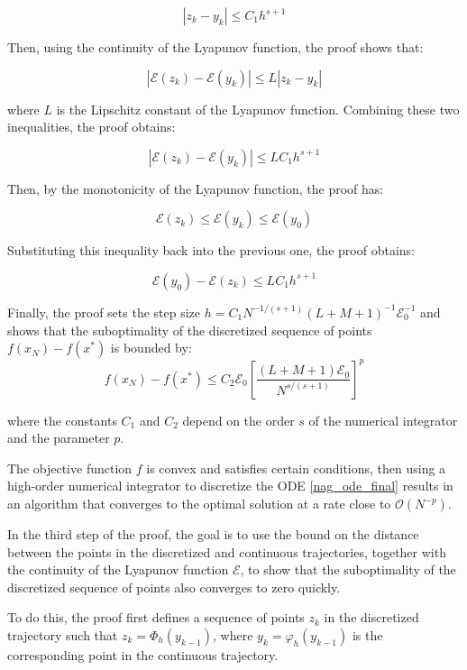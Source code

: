 \begin{enumerate}
          $$
              |z_k - y_k| \le C_1 h^{s+1}
          $$

          Then, using the continuity of the Lyapunov function, the proof shows that:

          $$
              |\mathcal{E}(z_k) - \mathcal{E}(y_k)| \le L |z_k - y_k|
          $$

          where $L$ is the Lipschitz constant of the Lyapunov function. Combining these two inequalities, the proof obtains:

          $$
              |\mathcal{E}(z_k) - \mathcal{E}(y_k)| \le L C_1 h^{s+1}
          $$

          Then, by the monotonicity of the Lyapunov function, the proof has:

          $$
              \mathcal{E}(z_k) \le \mathcal{E}(y_k) \le \mathcal{E}(y_0)
          $$

          Substituting this inequality back into the previous one, the proof obtains:

          $$
              \mathcal{E}(y_0) - \mathcal{E}(z_k) \le L C_1 h^{s+1}
          $$

          Finally, the proof sets the step size $h = C_1 N^{-1/(s+1)}(L+M+1)^{-1} \mathcal{E}_0^{-1}$ and shows that the suboptimality of the discretized sequence of points $f(x_N) - f(x^*)$ is bounded by:
          $$
              f(x_N) - f(x^*) \le C_2 \mathcal{E}_0 \left[\frac{(L+M+1) \mathcal{E}_0}{N^{s/(s+1)}}\right]^p
          $$

          where the constants $C_1$ and $C_2$ depend on the order $s$ of the numerical integrator and the parameter $p$.

          The objective function $f$ is convex and satisfies certain conditions, then using a high-order numerical integrator to discretize the ODE \eqref{nag_ode_final} results in an algorithm that converges to the optimal solution at a rate close to $\mathcal{O}(N^{-p})$.

          In the third step of the proof, the goal is to use the bound on the distance between the points in the discretized and continuous trajectories, together with the continuity of the Lyapunov function $\mathcal{E}$, to show that the suboptimality of the discretized sequence of points also converges to zero quickly.

          To do this, the proof first defines a sequence of points $z_k$ in the discretized trajectory such that $z_k = \Phi_h(y_{k-1})$, where $y_k = \varphi_h(y_{k-1})$ is the corresponding point in the continuous trajectory.


\end{enumerate}
